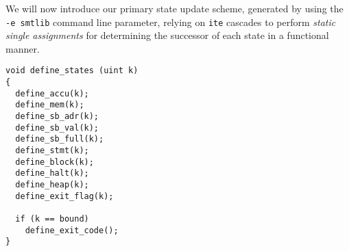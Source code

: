 We will now introduce our primary state update scheme, generated by using the \texttt{-e smtlib} command line parameter,
relying on \texttt{ite} cascades to perform \emph{static single assignments} for determining the successor of each state in a functional manner.%

\begin{lstlisting}[style=c++]
void define_states (uint k)
{
  define_accu(k);
  define_mem(k);
  define_sb_adr(k);
  define_sb_val(k);
  define_sb_full(k);
  define_stmt(k);
  define_block(k);
  define_halt(k);
  define_heap(k);
  define_exit_flag(k);

  if (k == bound)
    define_exit_code();
}
\end{lstlisting}


